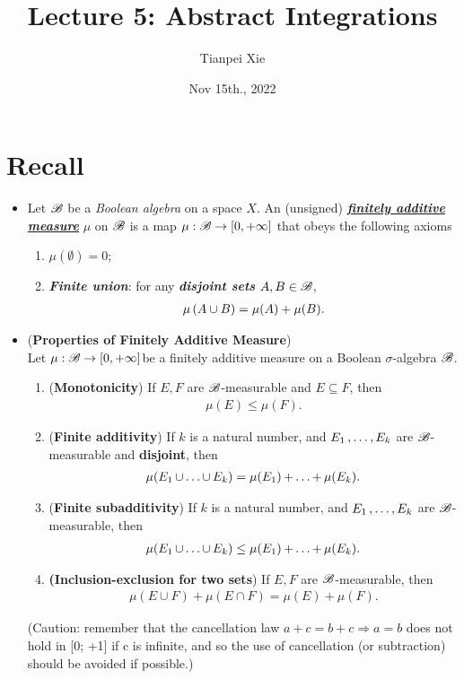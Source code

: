 \documentclass[11pt]{article}
\begin{document}
\title{Lecture 5:  Abstract Integrations}
\author{ Tianpei Xie}
\date{Nov 15th., 2022}
\maketitle
\tableofcontents
\newpage
\section{Recall}
\begin{itemize}
\item
\begin{definition}
Let ${\mathscr B}$ be a \emph{Boolean algebra} on a space $X$. An (unsigned) \underline{\emph{\textbf{finitely additive measure}}} $\mu$ on ${\mathscr B}$ is a map $\mu : {\mathscr B} \rightarrow [0,+\infty]$ that obeys the following axioms
\begin{enumerate}
\item $\mu(\emptyset) = 0$;
\item \emph{\textbf{Finite union}}: for any  \emph{\textbf{disjoint sets}} $A, B \in {\mathscr B}$, 
\begin{align*}
\mu\left(A\cup B\right) = \mu(A)+ \mu(B).
\end{align*} 
\end{enumerate}
\end{definition}

\item \begin{proposition} (\textbf{Properties of Finitely Additive Measure}) \citep{tao2011introduction}\\
Let $\mu: {\mathscr B} \rightarrow [0, +\infty]$be a finitely additive measure on a Boolean $\sigma$-algebra ${\mathscr B}$. 
\begin{enumerate}
\item (\textbf{Monotonicity}) If $E, F$ are ${\mathscr B}$-measurable and $E \subseteq F$, then
\begin{align*}
\mu(E) \le \mu(F).
\end{align*}
\item  (\textbf{Finite additivity}) If $k$ is a natural number, and $E_1 \,{,}\ldots{,}\, E_k$ are ${\mathscr B}$-measurable and \textbf{disjoint}, then 
\begin{align*}
\mu(E_1 \,{\cup}\ldots{\cup}\, E_k) = \mu(E_1)  \,{+}\ldots{+}\, \mu(E_k).
\end{align*}
\item  (\textbf{Finite subadditivity}) If $k$ is a natural number, and $E_1 \,{,}\ldots{,}\, E_k$ are ${\mathscr B}$-measurable, then
\begin{align*}
\mu(E_1 \,{\cup}\ldots{\cup}\, E_k) \le \mu(E_1)  \,{+}\ldots{+}\, \mu(E_k).
\end{align*}
\item \textbf{(Inclusion-exclusion for two sets}) If $E, F$ are ${\mathscr B}$-measurable, then
\begin{align*}
\mu(E \cup F ) + \mu(E \cap F ) = \mu(E) + \mu(F).
\end{align*}
\end{enumerate}
(Caution: remember that the cancellation law $a+c = b+c \Rightarrow a = b$ does not hold in [0; +1] if c is infinite, and so the use of cancellation
(or subtraction) should be avoided if possible.)
\end{proposition}


\end{itemize}
\end{document}
